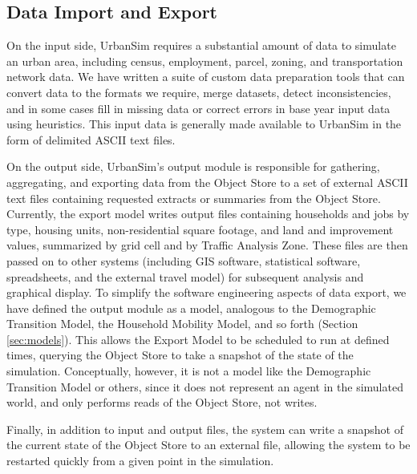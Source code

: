 
\subsection{Data Import and Export}

On the input side, UrbanSim requires a substantial amount of data
to simulate an urban area, including census, employment, parcel,
zoning, and transportation network data.  We have written a suite
of custom data preparation tools that can convert data to the
formats we require, merge datasets, detect inconsistencies, and in
some cases fill in missing data or correct errors in base year
input data using heuristics.  This input data is generally made
available to UrbanSim in the form of delimited ASCII text files.

On the output side, UrbanSim's output module is responsible for
gathering, aggregating, and exporting data from the Object Store
to a set of external ASCII text files containing requested
extracts or summaries from the Object Store. Currently, the export
model writes output files containing households and jobs by type,
housing units, non-residential square footage, and land and
improvement values, summarized by grid cell and by Traffic
Analysis Zone. These files are then passed on to other systems
(including GIS software, statistical software, spreadsheets, and
the external travel model) for subsequent analysis and graphical
display.  To simplify the software engineering aspects of data
export, we have defined the output module as a model, analogous to
the Demographic Transition Model, the Household Mobility Model,
and so forth (Section \ref{sec:models}).  This allows the Export
Model to be scheduled to run at defined times, querying the Object
Store to take a snapshot of the state of the simulation.
Conceptually, however, it is not a model like the Demographic
Transition Model or others, since it does not represent an agent
in the simulated world, and only performs reads of the Object
Store, not writes.

Finally, in addition to input and output files, the system can
write a snapshot of the current state of the Object Store to an
external file, allowing the system to be restarted quickly from a
given point in the simulation.

